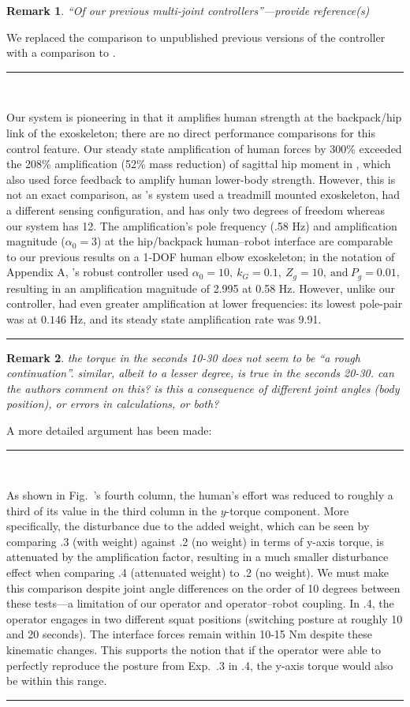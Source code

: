 \documentclass[10pt,letterpaper]{letter}
\renewcommand*{\ref}[1]{\zref{#1}}
\newcommand*{\ta}[1]{\textcolor[HTML]{107f10}{#1}}
\newcounter{reviewer}
\newtheorem{rev}{Remark}[reviewer]
\newcommand{\reviewer}[1]{\begin{rev} #1\end{rev}}
\newcommand{\response}[1]{\par{\hfill\begin{minipage}{\dimexpr\textwidth-2cm} #1\end{minipage}}}
\newcommand{\paperquote}[1]{%
	\begin{center}
		
		\begin{minipage}{.8\textwidth}
			{\rule{\textwidth}{.5pt}}\vspace{.5em}\\
			\begin{minipage}{\textwidth}\setlength{\parindent}{2em}#1\end{minipage}
			\vspace{.5em}
			{\rule{\textwidth}{.5pt}}
		\end{minipage}%
	\end{center}
}
\begin{document}
\begin{letter}{}
\reviewer{``Of our previous multi-joint controllers''---provide reference(s)}
\response{We replaced the comparison to unpublished previous versions of the controller with a comparison to \cite{ZanottoAkiyamaStegallAgrawal2015TRO}.}
\paperquote{
\ta{
	Our system is pioneering in that it amplifies human strength at the backpack/hip link of the exoskeleton; there are no direct performance comparisons for this control feature.
	Our steady state amplification of human forces by 300\% exceeded the 208\% amplification (52\% mass reduction) of sagittal hip moment in \cite{ZanottoAkiyamaStegallAgrawal2015TRO}, which also used force feedback to amplify human lower-body strength.
	However, this is not an exact comparison, as \cite{ZanottoAkiyamaStegallAgrawal2015TRO}'s system used a treadmill mounted exoskeleton, had a different sensing configuration, and has only two degrees of freedom whereas our system has 12.
	The amplification's pole frequency (.58 Hz) and amplification magnitude ($\alpha_0=3$) at the hip/backpack human--robot interface are comparable to our previous results on a 1-DOF human elbow exoskeleton; in the notation of Appendix A, \cite{HeThomasPaineSentis2019ACC}'s robust controller used $\alpha_0=10,\ k_G=0.1,\ Z_g=10,\ \text{and}\ P_g=0.01,$ resulting in an amplification magnitude of 2.995 at 0.58 Hz.
	However, unlike our controller, \cite{HeThomasPaineSentis2019ACC} had even greater amplification at lower frequencies: its lowest pole-pair was at $0.146$ Hz, and its steady state amplification rate was 9.91.
}
}

\reviewer{the torque in the seconds 10-30 does not seem to be ``a rough continuation''. similar, albeit to a lesser degree, is true in the seconds 20-30. can the authors comment on this? is this a consequence of different joint angles (body position), or errors in calculations, or both?}
\response{A more detailed argument has been made:}
\paperquote{
As shown in Fig.~\ref{fig:experiment}'s fourth column, the human's effort was reduced to roughly a third of its value in the third column in the $y$-torque component.
\ta{More specifically, the disturbance due to the added weight, which can be seen by comparing \ref{subs:amp}.3 (with weight) against \ref{subs:amp}.2 (no weight) in terms of y-axis torque, is attenuated by the amplification factor, resulting in a much smaller disturbance effect when comparing \ref{subs:amp}.4 (attenuated weight) to \ref{subs:amp}.2 (no weight). We must make this comparison despite joint angle differences on the order of 10 degrees between these tests---a limitation of our operator and operator--robot coupling. In \ref{subs:amp}.4, the operator engages in two different squat positions (switching posture at roughly 10 and 20 seconds). The interface forces remain within 10-15 Nm despite these kinematic changes. This supports the notion that if the operator were able to perfectly reproduce the posture from Exp.~\ref{subs:amp}.3 in \ref{subs:amp}.4, the y-axis torque would also be within this range.}
}


\end{letter}
\end{document}

